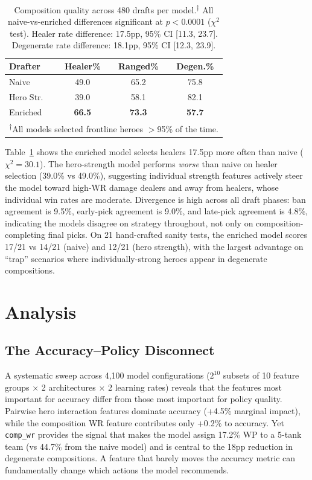 \documentclass[conference]{IEEEtran}
\begin{document}
\begin{table}[t]
\centering
\caption{Composition quality across 480 drafts per model.\textsuperscript{$\dagger$} All naive-vs-enriched differences significant at $p\!<\!0.0001$ ($\chi^2$ test). Healer rate difference: 17.5pp, 95\% CI [11.3, 23.7]. Degenerate rate difference: 18.1pp, 95\% CI [12.3, 23.9].}
\label{tab:comp}
\begin{tabular}{lccc}
\toprule
Drafter & Healer\% & Ranged\% & Degen.\% \\
\midrule
Naive & 49.0 & 65.2 & 75.8 \\
Hero Str. & 39.0 & 58.1 & 82.1 \\
Enriched & \textbf{66.5} & \textbf{73.3} & \textbf{57.7} \\
\bottomrule
\multicolumn{4}{l}{\footnotesize\textsuperscript{$\dagger$}All models selected frontline heroes $>$95\% of the time.}
\end{tabular}
\end{table}

Table~\ref{tab:comp} shows the enriched model selects healers 17.5pp more often than naive ($\chi^2\!=\!30.1$). The hero-strength model performs \textit{worse} than naive on healer selection (39.0\% vs 49.0\%), suggesting individual strength features actively steer the model toward high-WR damage dealers and away from healers, whose individual win rates are moderate. Divergence is high across all draft phases: ban agreement is 9.5\%, early-pick agreement is 9.0\%, and late-pick agreement is 4.8\%, indicating the models disagree on strategy throughout, not only on composition-completing final picks. On 21 hand-crafted sanity tests, the enriched model scores 17/21 vs 14/21 (naive) and 12/21 (hero strength), with the largest advantage on ``trap'' scenarios where individually-strong heroes appear in degenerate compositions.

\section{Analysis}

\subsection{The Accuracy--Policy Disconnect}

A systematic sweep across 4,100 model configurations ($2^{10}$ subsets of 10 feature groups $\times$ 2 architectures $\times$ 2 learning rates) reveals that the features most important for accuracy differ from those most important for policy quality. Pairwise hero interaction features dominate accuracy (+4.5\% marginal impact), while the composition WR feature contributes only +0.2\% to accuracy. Yet \texttt{comp\_wr} provides the signal that makes the model assign 17.2\% WP to a 5-tank team (vs 44.7\% from the naive model) and is central to the 18pp reduction in degenerate compositions. A feature that barely moves the accuracy metric can fundamentally change which actions the model recommends.
\end{document}
